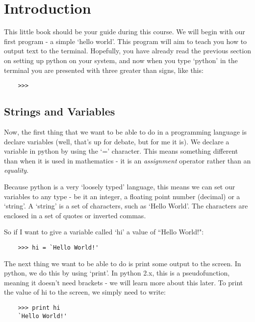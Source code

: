 \section{Introduction}

This little book should be your guide during this course. We will begin with
our first program - a simple `hello world'. This program will aim to teach you
how to output text to the terminal. Hopefully, you have already read the
previous section on setting up python on your system, and now when you type
`python' in the terminal you are presented with three greater than signs, like
this:

\begin{lstlisting}
    >>>
\end{lstlisting}

\subsection{Strings and Variables}

Now, the first thing that we want to be able to do in a programming language is
declare variables (well, that's up for debate, but for me it is). We declare a
variable in python by using the `=' character. This means something different
than when it is used in mathematics - it is an \emph{assignment} operator rather
than an \emph{equality}.

Because python is a very `loosely typed' language, this means we can set our
variables to any type - be it an integer, a floating point number (decimal) or
a `string'. A `string' is a set of characters, such as `Hello World'. The
characters are enclosed in a set of quotes or inverted commas.

So if I want to give a variable called `hi' a value of ``Hello World!":

\begin{lstlisting}
    >>> hi = `Hello World!'
\end{lstlisting}

The next thing we want to be able to do is print some output to the screen. In
python, we do this by using `print'. In python 2.x, this is a pseudofunction,
meaning it doesn't need brackets - we will learn more about this later. To print
the value of hi to the screen, we simply need to write:

\begin{lstlisting}
    >>> print hi
    `Hello World!'
\end{lstlisting}


